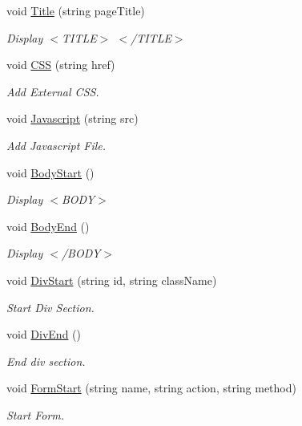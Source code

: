 \begin{DoxyCompactItemize}
void \hyperlink{classHTMLTags_a5128d6f1c6be5ac1689047fc9d0d159f}{Title} (string page\-Title)
\begin{DoxyCompactList}\small\item\em Display $<$\-T\-I\-T\-L\-E$>$ $<$/\-T\-I\-T\-L\-E$>$ \end{DoxyCompactList}\item 
void \hyperlink{classHTMLTags_a4e9e18580cc7f2b82c82e4f81e39be50}{C\-S\-S} (string href)
\begin{DoxyCompactList}\small\item\em Add External C\-S\-S. \end{DoxyCompactList}\item 
void \hyperlink{classHTMLTags_aea041d720f12a210615c95350774e6aa}{Javascript} (string src)
\begin{DoxyCompactList}\small\item\em Add Javascript File. \end{DoxyCompactList}\item 
void \hyperlink{classHTMLTags_af1fb7b90b9ebb83177da18aba1ef86a9}{Body\-Start} ()
\begin{DoxyCompactList}\small\item\em Display $<$\-B\-O\-D\-Y$>$ \end{DoxyCompactList}\item 
void \hyperlink{classHTMLTags_a7cae36bd3a0e6f35e89494e5cda64971}{Body\-End} ()
\begin{DoxyCompactList}\small\item\em Display $<$/\-B\-O\-D\-Y$>$ \end{DoxyCompactList}\item 
void \hyperlink{classHTMLTags_a897512b202cfd12729e8fa24e67ea4d6}{Div\-Start} (string id, string class\-Name)
\begin{DoxyCompactList}\small\item\em Start Div Section. \end{DoxyCompactList}\item 
void \hyperlink{classHTMLTags_aa82b2d3d85b3afd29e5641dbe1ace439}{Div\-End} ()
\begin{DoxyCompactList}\small\item\em End div section. \end{DoxyCompactList}\item 
void \hyperlink{classHTMLTags_a1489ccf4629069eca5e550eeb8e8e887}{Form\-Start} (string name, string action, string method)
\begin{DoxyCompactList}\small\item\em Start Form. \end{DoxyCompactList}\item 

\end{DoxyCompactItemize}

